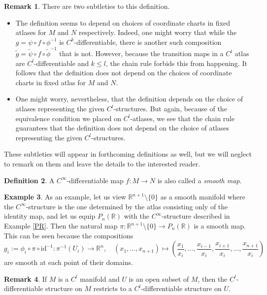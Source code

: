 \documentclass{amsart}
\numberwithin{equation}{section}
\newcommand{\bR}{\mathbb{R}}
\theoremstyle{definition}
\newtheorem{definition}{Definition} [section]
\newtheorem{example}[definition]{Example}
\newtheorem{remark}[definition]{Remark}
\theoremstyle{theorem}
\begin{document}
\begin{remark}
There are two subtleties to this definition. 
\begin{itemize}
\item The definition seems to depend on choices of coordinate charts in fixed atlases for $M$ and $N$ respectively. Indeed, one might worry that while the $g = \psi \circ f \circ \phi^{-1}$ is $C^k$-differentiable, there is another such composition $\widetilde{g} = \widetilde{\psi} \circ f \circ \widetilde{\phi}^{-1}$ that is not. However, because the transition maps in a $C^l$ atlas are $C^l$-differentiable and $k \le l$, the chain rule forbids this from happening. It follows that the definition does not depend on the choices of coordinate charts in fixed atlas for $M$ and $N$. 
\item One might worry, nevertheless, that the definition depends on the choice of atlases representing the given $C^l$-structures. But again, because of the equivalence condition we placed on $C^l$-atlases, we see that the chain rule guarantees that the definition does not depend on the choice of atlases representing the given $C^l$-structures. 
\end{itemize}
These subtleties will appear in forthcoming definitions as well, but we will neglect to remark on them and leave the details to the interested reader. 
\end{remark}

\begin{definition}
A $C^\infty$-differentiable map $f : M \to N$ is also called a {\em smooth map}. 
\end{definition}

\begin{example}
As an example, let us view $\bR^{n+1} \setminus \{0\}$ as a smooth manifold where the $C^\infty$-structure is the one determined by the atlas consisting only of the identity map, and let us equip $P_n(\bR)$ with the $C^\infty$-structure described in Example \ref{PR}. Then the natural map 
$\pi : \mathbb{R}^{n+1}\setminus\{0\} \to P_n(\mathbb{R})$ is a smooth map. This can be seen because the compositions 
$$
g_i := \phi_i \circ \pi \circ \text{id}^{-1}: \pi^{-1}(U_i) \to \mathbb{R}^n,
\quad (x_1,\ldots,x_{n+1})\mapsto (\frac{x_1}{x_i},\ldots, \frac{x_{i-1}}{x_i},\frac{x_{i+1}}{x_i},\ldots, 
\frac{x_{n+1}}{x_i}) 
$$
are smooth at each point of their domains. 
\end{example}

\begin{remark}
If $M$ is a $C^l$ manifold and $U$ is an open subset of $M$, then the $C^l$-differentiable structure on $M$ 
restricts to a $C^l$-differentiable structure on $U$. 
\end{remark}
\end{document}
